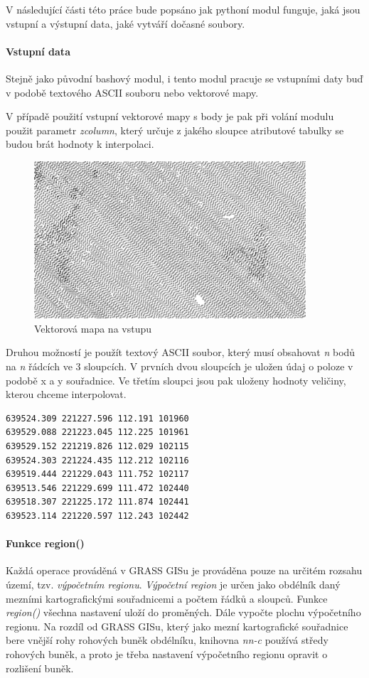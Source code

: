 \documentclass[12pt,a4paper]{article}
\begin{document}
V následující části této práce bude popsáno jak pythoní modul funguje, jaká jsou vstupní a výstupní data, jaké vytváří dočasné soubory.

\paragraph{Vstupní data}
Stejně jako původní bashový modul, i tento modul pracuje se vstupními daty buď v podobě textového ASCII souboru nebo vektorové mapy. 

V případě použití vstupní vektorové mapy s body je pak při volání modulu použit parametr \textit{zcolumn}, který určuje z jakého sloupce atributové tabulky se budou brát hodnoty k interpolaci.

\begin{figure}[h!]
\centering
\includegraphics[width=0.9\textwidth]{../img/vstup_vect_map.png}
\caption{Vektorová mapa na vstupu}
\label{fig:vstup_vect_map}
\end{figure}

\newpage
Druhou možností je použít textový ASCII soubor, který musí obsahovat \textit{n} bodů na \textit{n} řádcích ve 3 sloupcích. V prvních dvou sloupcích je uložen údaj o poloze v podobě x a y souřadnice. Ve třetím sloupci jsou pak uloženy hodnoty veličiny, kterou chceme interpolovat.

\begin{lstlisting}[caption={Příklad vstupního souboru}]
639524.309 221227.596 112.191 101960
639529.088 221223.045 112.225 101961
639529.152 221219.826 112.029 102115
639524.303 221224.435 112.212 102116
639519.444 221229.043 111.752 102117
639513.546 221229.699 111.472 102440
639518.307 221225.172 111.874 102441
639523.114 221220.597 112.243 102442
\end{lstlisting}

\bigskip
\paragraph{Funkce region()}
Každá operace prováděná v GRASS GISu je prováděna pouze na určitém rozsahu území, tzv. \textit{výpočetním regionu}. \textit{Výpočetní region} je určen jako obdélník daný mezními kartografickými souřadnicemi a počtem řádků a sloupců. 
Funkce \textit{region()} všechna nastavení uloží do proměných. Dále vypočte plochu výpočetního regionu. Na rozdíl od GRASS GISu, který jako mezní kartografické souřadnice bere vnější rohy rohových buněk obdélníku, knihovna \textit{nn-c} používá středy rohových buněk, a proto je třeba nastavení výpočetního regionu opravit o rozlišení buněk.
\end{document}
